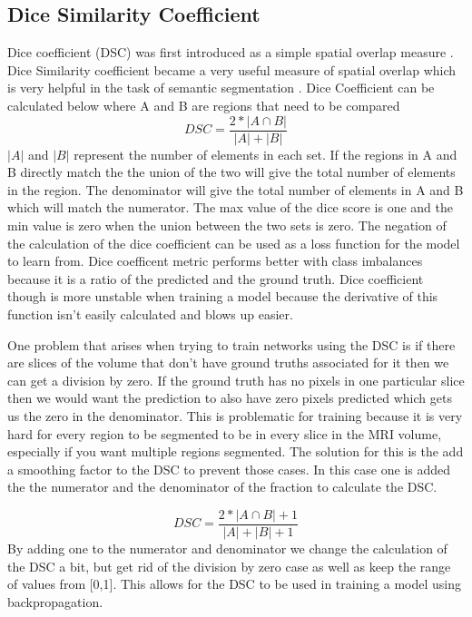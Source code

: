     
\subsection{Dice Similarity Coefficient}
    Dice coefficient (DSC) was first introduced as a simple spatial overlap measure \cite{10.2307/1932409dice}. 
    Dice Similarity coefficient became a very useful measure of spatial overlap which is very helpful in the task of semantic segmentation \cite{dice2004}. 
    Dice Coefficient can be calculated below where A and B are regions that need to be compared
\begin{equation}
 DSC = \frac{2*|A \cap B|}{|A| + |B|}\label{eq:dicescore} 
\end{equation}
    $|A|$ and $|B|$ represent the number of elements in each set. 
    If the regions in A and B directly match the the union of the two will give the total number of elements in the region. 
    The denominator will give the total number of elements in A and B which will match the numerator. 
    The max value of the dice score is one and the min value is zero when the union between the two sets is zero. 
    The negation of the calculation of the dice coefficient can be used as a loss function for the model to learn from. 
    Dice coefficent metric performs better with class imbalances because it is a ratio of the predicted and the ground truth. 
    Dice coefficient though is more unstable when training a model because the derivative of this function isn't easily calculated and blows up easier.
    
    One problem that arises when trying to train networks using the DSC is if there are slices of the volume that don't have ground truths associated for it then we can get a division by zero. 
    If the ground truth has no pixels in one particular slice then we would want the prediction to also have zero pixels predicted which gets us the zero in the denominator. 
    This is problematic for training because it is very hard for every region to be segmented to be in every slice in the MRI volume, especially if you want multiple regions segmented. 
    The solution for this is the add a smoothing factor to the DSC to prevent those cases. 
    In this case one is added the the numerator and the denominator of the fraction to calculate the DSC.
    
    \begin{equation}
 DSC = \frac{2*|A \cap B| + 1}{|A| + |B| + 1}\label{eq:dicescoreloss} 
\end{equation}
    By adding one to the numerator and denominator we change the calculation of the DSC a bit, but get rid of the division by zero case as well as keep the range of values from [0,1]. 
    This allows for the DSC to be used in training a model using backpropagation. 
    

